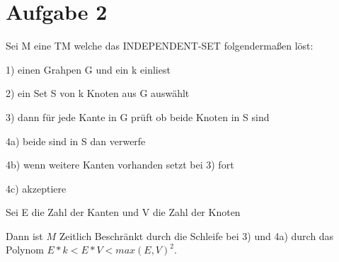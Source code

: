 \section*{Aufgabe 2}

Sei M eine TM welche das INDEPENDENT-SET folgendermaßen löst:
	
	1) einen Grahpen G und ein k einliest

	2) ein Set S von k Knoten aus G auswählt

	3) dann für jede Kante in G prüft ob beide Knoten in S sind

	4a) beide sind in S dan verwerfe

	4b) wenn weitere Kanten vorhanden setzt bei 3) fort

	4c) akzeptiere
	
	Sei E die Zahl der Kanten und V die Zahl der Knoten
	
	Dann ist $M$ Zeitlich Beschränkt durch die Schleife bei 3) und 4a)
	durch das Polynom $E*k < E * V < max(E,V)^2$.
	
	
	